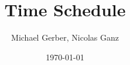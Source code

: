 %
%
%
%







\title{Time Schedule} %
\author{Michael Gerber, Nicolas Ganz } %
\date{\today}
\maketitle %

